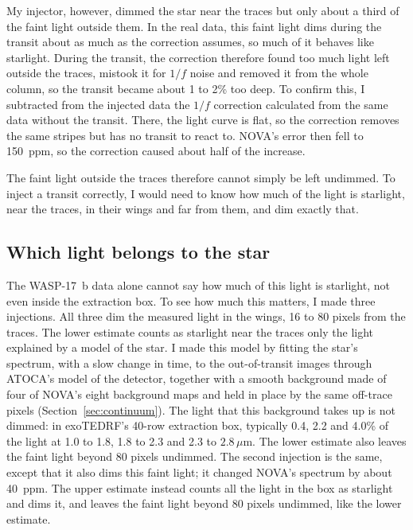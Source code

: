 My injector, however, dimmed the star near the traces but only about a third
of the faint light outside them. In the real data, this faint light dims
during the transit about as much as the correction assumes, so much of it
behaves like starlight. During the transit, the correction therefore found too
much light left outside the traces, mistook it for $1/f$ noise and removed it
from the whole column, so the transit became about 1 to 2\% too deep. To
confirm this, I subtracted from the injected data the $1/f$ correction
calculated from the same data without the transit. There, the light curve is
flat, so the correction removes the same stripes but has no transit to react
to. NOVA's error then fell to 150~ppm, so the correction caused about half of
the increase.

The faint light outside the traces therefore cannot simply be left undimmed.
To inject a transit correctly, I would need to know how much of the light is
starlight, near the traces, in their wings and far from them, and dim exactly
that.

\subsection{Which light belongs to the star}
\label{sec:which-light}

The WASP-17~b data alone cannot say how much of this light is starlight, not
even inside the extraction box. To see how much this matters, I made three
injections. All three dim the measured light in the wings, 16 to 80 pixels
from the traces. The lower estimate counts as starlight near the traces only
the light explained by a model of the star. I made this model by fitting the
star's spectrum, with a slow change in time, to the out-of-transit images
through ATOCA's model of the detector, together with a smooth background made
of four of NOVA's eight background maps and held in place by the same
off-trace pixels (Section~\ref{sec:continuum}). The light that this background
takes up is not dimmed: in exoTEDRF's 40-row extraction box, typically 0.4,
2.2 and 4.0\% of the light at 1.0 to 1.8, 1.8 to 2.3 and 2.3 to
$2.8\,\mu\mathrm{m}$. The lower estimate also leaves the faint light beyond 80
pixels undimmed. The second injection is the same, except that it also dims
this faint light; it changed NOVA's spectrum by about 40~ppm. The upper
estimate instead counts all the light in the box as starlight and dims it,
and leaves the faint light beyond 80 pixels undimmed, like the lower estimate.

